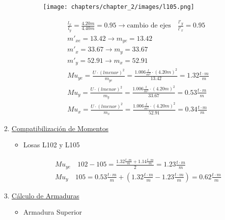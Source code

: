 \begin{enumerate}
\begin{itemize}
\begin{figure}[H]
\begin{center}
     \texttt{[image: chapters/chapter\_2/images/l105.png]}
\end{center}
\end{figure}

\begin{align*}
& \frac{l_x}{l_y} = \frac{4.20m}{4.40m} = 0.95 \rightarrow \text{cambio de ejes} \quad \frac{l'_y}{l'_x} = 0.95\\
& m'_{xe} = 13.42 \rightarrow m_{ye} = 13.42 \\
& m'_x = 33.67 \rightarrow m_y = 33.67 \\
& m'_y= 52.91 \rightarrow m_x = 52.91 \\
& Mu_{ye} = \frac{U \cdot (lmenor)^2}{m_{ye}} = \frac{1.006 \frac{t}{m^2} \cdot (4.20m)^2}{13.42} = 1.32 \frac{t \cdot m}{m} \\
& Mu_y = \frac{U \cdot (lmenor)^2}{m_y} = \frac{1.006 \frac{t}{m^2} \cdot (4.20m)^2}{33.67} = 0.53 \frac{t \cdot m}{m} \\
& Mu_x = \frac{U \cdot (lmenor)^2}{m_x} = \frac{1.006 \frac{t}{m^2} \cdot (4.20m)^2}{52.91} = 0.34 \frac{t \cdot m}{m}
\end{align*}
\end{itemize}


\item \underline{Compatibilización de Momentos}\\

\begin{itemize}
\item Losas L102 y L105

\begin{align*}
& Mu_{ye} \quad 102-105 = \frac{1.32 \frac{t \cdot m}{m} + 1.14 \frac{t \cdot m}{m}}{2} = 1.23 \frac{t \cdot m}{m} \\
& Mu_y \quad 105 =  0.53 \frac{t \cdot m}{m} + (1.32 \frac{t \cdot m}{m} - 1.23 \frac{t \cdot m}{m})= 0.62 \frac{t \cdot m}{m}
\end{align*}

\end{itemize}

\newpage
\item \underline{Cálculo de Armaduras}\\
\begin{itemize}
\item Armadura Superior


\end{itemize}
\end{enumerate}
